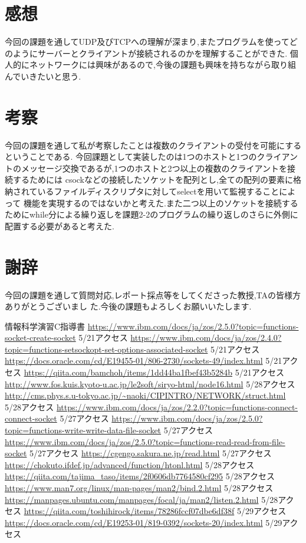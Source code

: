 \documentclass[dvipdfmx]{jarticle}
\begin{document}
\section{感想}
今回の課題を通してUDP及びTCPへの理解が深まり,またプログラムを使ってどのようにサーバーとクライアントが接続されるのかを理解することができた.
個人的にネットワークには興味があるので,今後の課題も興味を持ちながら取り組んでいきたいと思う.
\section{考察}
今回の課題を通して私が考察したことは複数のクライアントの受付を可能にするということである.
今回課題として実装したのは1つのホストと1つのクライアントのメッセージ交換であるが,1つのホストと2つ以上の複数のクライアントを接続するためには
csockなどの接続したソケットを配列とし,全ての配列の要素に格納されているファイルディスクリプタに対してselectを用いて監視することによって
    機能を実現するのではないかと考えた.また二つ以上のソケットを接続するためにwhile分による繰り返しを課題2-2のプログラムの繰り返しのさらに外側に配置する必要があると考えた.
\section{謝辞}
今回の課題を通して質問対応,レポート採点等をしてくださった教授,TAの皆様方ありがとうございまし
た.今後の課題もよろしくお願いいたします.
\begin{thebibliography}{99}
    情報科学演習C指導書
     \url{https://www.ibm.com/docs/ja/zos/2.5.0?topic=functions-socket-create-socket} 5/21アクセス
     \url{https://www.ibm.com/docs/ja/zos/2.4.0?topic=functions-setsockopt-set-options-associated-socket} 5/21アクセス
     \url{https://docs.oracle.com/cd/E19455-01/806-2730/sockets-49/index.html} 5/21アクセス
     \url{https://qiita.com/bamchoh/items/1dd44ba1fbef43b5284b} 5/21アクセス
     \url{http://www.fos.kuis.kyoto-u.ac.jp/le2soft/siryo-html/node16.html} 5/28アクセス
     \url{http://cms.phys.s.u-tokyo.ac.jp/~naoki/CIPINTRO/NETWORK/struct.html} 5/28アクセス
     \url{https://www.ibm.com/docs/ja/zos/2.2.0?topic=functions-connect-connect-socket} 5/27アクセス
     \url{https://www.ibm.com/docs/ja/zos/2.5.0?topic=functions-write-write-data-file-socket} 5/27アクセス
     \url{https://www.ibm.com/docs/ja/zos/2.5.0?topic=functions-read-read-from-file-socket} 5/27アクセス
     \url{https://cgengo.sakura.ne.jp/read.html} 5/27アクセス
     \url{https://chokuto.ifdef.jp/advanced/function/htonl.html} 5/28アクセス
     \url{https://qiita.com/tajima_taso/items/2f0606db7764580cf295} 5/28アクセス
     \url{https://www.man7.org/linux/man-pages/man2/bind.2.html} 5/28アクセス
     \url{https://manpages.ubuntu.com/manpages/focal/ja/man2/listen.2.html} 5/28アクセス
     \url{https://qiita.com/toshihirock/items/78286fccf07dbe6df38f} 5/29アクセス
     \url{https://docs.oracle.com/cd/E19253-01/819-0392/sockets-20/index.html} 5/29アクセス
\end{thebibliography}
\end{document}

